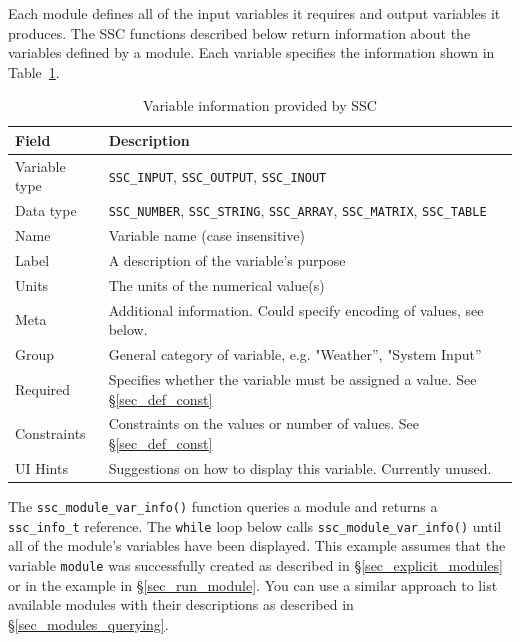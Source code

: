 \documentclass{scrartcl} %
\newcommand{\+}{\discretionary{\mbox{\scriptsize$\hookleftarrow$}}{}{}}
\begin{document}
Each module defines all of the input variables it requires and output variables it produces. The SSC functions described below return information about the variables defined by a module. Each variable specifies the information shown in Table~\ref{tab_varinfo}.

\begin{table}[ht]
\begin{center}
\begin{tabular}{ll}
Field & Description\\
\hline
Variable type & \texttt{SSC\_INPUT}, \texttt{SSC\_OUTPUT}, \texttt{SSC\_INOUT} \\
Data type & \texttt{SSC\_NUMBER}, \texttt{SSC\_STRING}, \texttt{SSC\_ARRAY}, \texttt{SSC\_MATRIX}, \texttt{SSC\_TABLE} \\
Name & Variable name (case insensitive) \\
Label & A description of the variable's purpose \\
Units & The units of the numerical value(s) \\
Meta & Additional information. Could specify encoding of values, see below. \\
Group & General category of variable, e.g. "Weather'', "System Input'' \\
Required & Specifies whether the variable must be assigned a value. See \S\ref{sec_def_const} \\
Constraints & Constraints on the values or number of values. See \S\ref{sec_def_const} \\
UI Hints & Suggestions on how to display this variable.  Currently unused. \\
\end{tabular}
\caption{Variable information provided by SSC}
\label{tab_varinfo}
\end{center}
\end{table}

The \texttt{ssc\_module\_var\_info()} function queries a module and returns a \texttt{ssc\_info\_t} reference. The \texttt{while} loop below calls \texttt{ssc\_module\_var\_info()} until all of the module's variables have been displayed. This example assumes that the variable \texttt{module} was successfully created as described in \S\ref{sec_explicit_modules} or in the example in \S\ref{sec_run_module}. You can use a similar approach to list available modules with their descriptions as described in \S\ref{sec_modules_querying}.
\end{document}
